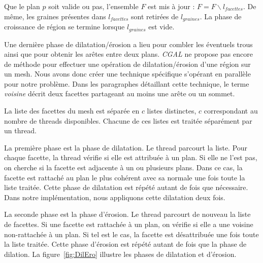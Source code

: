 \documentclass[12pt, twoside]{article}
\begin{document}
Que le plan $p$ soit valide ou pas, l'ensemble $F$ est mis à jour : $F = F\backslash l_{facettes}$. De même, les graines présentes dans $l_{facettes}$ sont retirées de $l_{graines}$. La phase de croissance de région se termine lorsque $l_{graines}$ est vide.

Une dernière phase de dilatation/érosion a lieu pour combler les éventuels trous ainsi que pour obtenir les arêtes entre deux plans. \textit{CGAL} ne propose pas encore de méthode pour effectuer une opération de dilatation/érosion d'une région sur un mesh. Nous avons donc créer une technique spécifique s'opérant en parallèle  pour notre problème. Dans les paragraphes détaillant cette technique, le terme \textit{voisine} décrit deux facettes partageant au moins une arête ou un sommet.

La liste des facettes du mesh est séparée en $c$ listes distinctes, $c$ correspondant au nombre de threads disponibles. Chacune de ces listes est traitée séparément par un thread.

La première phase est la phase de dilatation. Le thread parcourt la liste. Pour chaque facette, la thread vérifie si elle est attribuée à un plan. Si elle ne l'est pas, on cherche si la facette est adjacente à un ou plusieurs plans. Dans ce cas, la facette est rattaché au plan le plus cohérent avec sa normale une fois toute la liste traitée. Cette phase de dilatation est répété autant de fois que nécessaire. Dans notre implémentation, nous appliquons cette dilatation deux fois.

La seconde phase est la phase d'érosion. Le thread parcourt de nouveau la liste de facettes. Si une facette est rattachée à un plan, on vérifie si elle a une voisine non-rattachée à un plan. Si tel est le cas, la facette est désattribuée une fois toute la liste traitée. Cette phase d'érosion est répété autant de fois que la phase de dilation. La figure~\ref{fig:DilEro} illustre les phases de dilatation et d'érosion.
\end{document}
